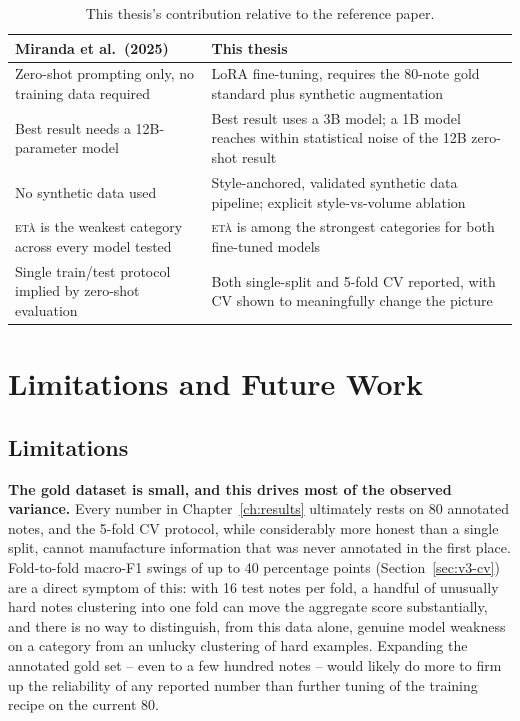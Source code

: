 \documentclass[12pt,a4paper]{report}
\newcommand{\ETA}{\textsc{et\`a}}
\begin{document}
\begin{table}[htbp]
\centering
\caption{This thesis's contribution relative to the reference paper.}
\label{tab:contribution-summary}
\begin{tabular}{p{5.6cm}p{5.6cm}}
\toprule
Miranda et al.\ (2025) & This thesis \\
\midrule
Zero-shot prompting only, no training data required & LoRA fine-tuning, requires the 80-note gold standard plus synthetic augmentation \\
Best result needs a 12B-parameter model & Best result uses a 3B model; a 1B model reaches within statistical noise of the 12B zero-shot result \\
No synthetic data used & Style-anchored, validated synthetic data pipeline; explicit style-vs-volume ablation \\
\ETA{} is the weakest category across every model tested & \ETA{} is among the strongest categories for both fine-tuned models \\
Single train/test protocol implied by zero-shot evaluation & Both single-split and 5-fold CV reported, with CV shown to meaningfully change the picture \\
\bottomrule
\end{tabular}
\end{table}

\chapter{Limitations and Future Work}
\label{ch:limitations}

\section{Limitations}

\textbf{The gold dataset is small, and this drives most of the observed variance.} Every number in Chapter~\ref{ch:results} ultimately rests on 80 annotated notes, and the 5-fold CV protocol, while considerably more honest than a single split, cannot manufacture information that was never annotated in the first place. Fold-to-fold macro-F1 swings of up to 40 percentage points (Section~\ref{sec:v3-cv}) are a direct symptom of this: with 16 test notes per fold, a handful of unusually hard notes clustering into one fold can move the aggregate score substantially, and there is no way to distinguish, from this data alone, genuine model weakness on a category from an unlucky clustering of hard examples. Expanding the annotated gold set -- even to a few hundred notes -- would likely do more to firm up the reliability of any reported number than further tuning of the training recipe on the current 80.
\end{document}
